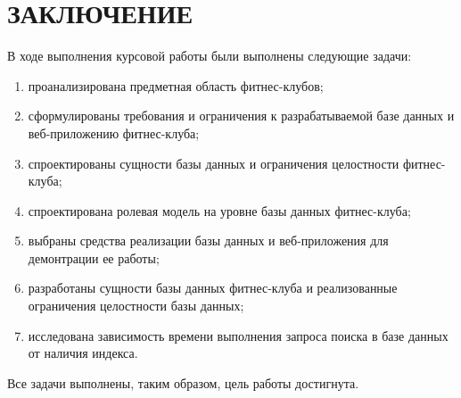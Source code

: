 \section*{\hfill ЗАКЛЮЧЕНИЕ \hfill}

В ходе выполнения курсовой работы были выполнены следующие задачи:
\begin{enumerate}[label=\arabic*)]
	\item проанализирована предметная область фитнес-клубов;
	\item сформулированы требования и ограничения к разрабатываемой базе данных и веб-приложению фитнес-клуба;
	\item спроектированы сущности базы данных и ограничения целостности фитнес-клуба;
	\item спроектирована ролевая модель на уровне базы данных фитнес-клуба;
	\item выбраны средства реализации базы данных и веб-приложения для демонтрации ее работы;
	\item разработаны сущности базы данных фитнес-клуба и реализованные ограничения целостности базы данных;
	\item исследована зависимость времени выполнения запроса поиска в базе данных от наличия индекса.
\end{enumerate}

Все задачи выполнены, таким образом, цель работы достигнута.